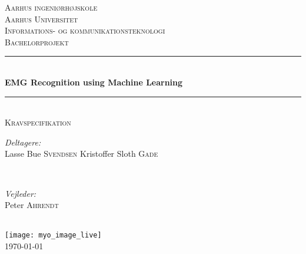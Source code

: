 \documentclass[pdftex, 11pt, a4paper, twoside, danish]{memoir}
\begin{document}
    \begin{titlingpage}
        \newcommand{\HRule}{\rule{\linewidth}{0.5mm}} %
        
        \center %
        \textsc{\LARGE Aarhus ingeniørhøjskole\\Aarhus Universitet}\\[1.5cm] %
        \textsc{\Large Informations- og kommunikationsteknologi}\\[0.5cm] %
        \textsc{\large Bachelorprojekt}\\[0.5cm] %
        
        \HRule \\[0.4cm]
        { \huge \bfseries EMG Recognition using Machine Learning}\\[0.4cm] %
        \HRule \\[.5cm]
        \textsc{\large Kravspecifikation}\\[0.5cm] %
        
        \begin{minipage}{0.4\textwidth}
        	\begin{flushleft} \large
        		\emph{Deltagere:}\\
        		Lasse Bue \textsc{Svendsen}
        		Kristoffer Sloth \textsc{Gade} %
        	\end{flushleft}
        \end{minipage}
        ~
        \begin{minipage}{0.4\textwidth}
        	\begin{flushright} \large
        		\emph{Vejleder:} \\
        		Peter \textsc{Ahrendt} %
        	\end{flushright}
        \end{minipage}\\[2cm]
        
        \texttt{[image: myo\_image\_live]}\\[1.5cm] %
        
        {\large \today}\\[1cm] %
        
        \vfill %
    \end{titlingpage}
    
\end{document}
